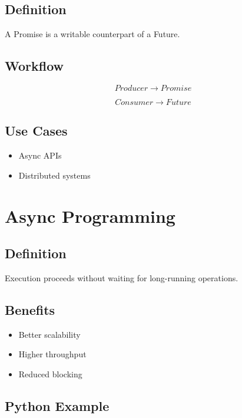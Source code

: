 \subsection{Definition}

A Promise is a writable counterpart of a Future.

\subsection{Workflow}

\[
Producer \rightarrow Promise
\]

\[
Consumer \rightarrow Future
\]

\subsection{Use Cases}

\begin{itemize}
\item Async APIs
\item Distributed systems
\end{itemize}

\section{Async Programming}

\subsection{Definition}

Execution proceeds without waiting for long-running operations.

\subsection{Benefits}

\begin{itemize}
\item Better scalability
\item Higher throughput
\item Reduced blocking
\end{itemize}

\subsection{Python Example}

